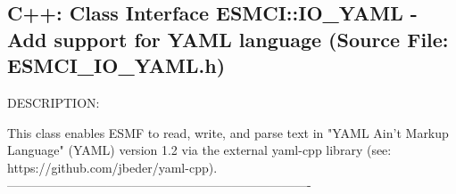  
\setlength{\oldparskip}{\parskip}
\setlength{\parskip}{1.5ex}
\setlength{\oldparindent}{\parindent}
\setlength{\parindent}{0pt}
\setlength{\oldbaselineskip}{\baselineskip}
\setlength{\baselineskip}{11pt}
 
\def\bv{\begin{verbatim}}
\def\ev{\end{verbatim}}
\def\be{\begin{equation}}
\def\ee{\end{equation}}
\def\bea{\begin{eqnarray}}
\def\eea{\end{eqnarray}}
\def\bi{\begin{itemize}}
\def\ei{\end{itemize}}
\def\bn{\begin{enumerate}}
\def\en{\end{enumerate}}
\def\bd{\begin{description}}
\def\ed{\end{description}}
\def\({\left (}
\def\){\right )}
\def\[{\left [}
\def\]{\right ]}
\def\<{\left  \langle}
\def\>{\right \rangle}
\def\cI{{\cal I}}
\def\diag{\mathop{\rm diag}}
\def\tr{\mathop{\rm tr}}


 
\subsection{C++:  Class Interface ESMCI::IO\_YAML - Add support for YAML language (Source File: ESMCI\_IO\_YAML.h)}


  
{\sf DESCRIPTION:\\ }


    This class enables ESMF to read, write, and parse text in
    "YAML Ain't Markup Language" (YAML) version 1.2 via the external
    yaml-cpp library (see: https://github.com/jbeder/yaml-cpp).
  -------------------------------------------------------------------------
  
